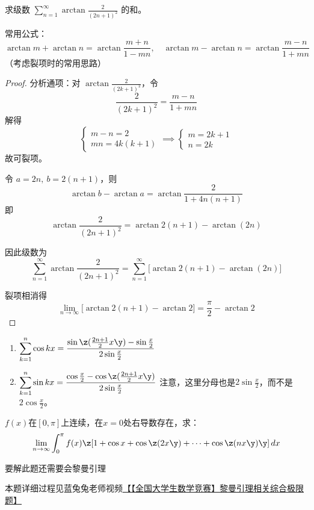 \begin{example}
求级数 \(\displaystyle \sum_{n=1}^{\infty} \arctan\frac{2}{(2n+1)^2}\) 的和。
\end{example}

\begin{remark}
常用公式：
\[
\arctan m + \arctan n = \arctan\frac{m+n}{1-mn}, \quad
\arctan m - \arctan n = \arctan\frac{m-n}{1+mn}
\]
（考虑裂项时的常用思路）
\end{remark}

\begin{proof}
分析通项：对 \(\displaystyle \arctan\frac{2}{(2k+1)^2}\)，令
\[
\frac{2}{(2k+1)^2} = \frac{m-n}{1+mn}
\]
解得
\[
\begin{cases}
m-n=2 \\
mn=4k(k+1)
\end{cases}
\implies
\begin{cases}
m=2k+1 \\
n=2k
\end{cases}
\]
故可裂项。

令 \(a=2n,\ b=2(n+1)\)，则
\[
\arctan b - \arctan a = \arctan\frac{2}{1+4n(n+1)}
\]
即
\[
\arctan\frac{2}{(2n+1)^2} = \arctan 2(n+1) - \arctan(2n)
\]

因此级数为
\[
\sum_{n=1}^{\infty} \arctan\frac{2}{(2n+1)^2}
= \sum_{n=1}^{\infty} \big[\arctan 2(n+1) - \arctan(2n)\big]
\]

裂项相消得
\[
\lim_{n\to\infty} \big[\arctan 2(n+1) - \arctan 2\big]
= \frac{\pi}{2} - \arctan 2
\]
\end{proof}

\begin{lemma}\label{三角等式}
\begin{enumerate}
\item $ \displaystyle \sum\limits_{k=1}^{n} \cos kx = 
        \frac{\sin\z(\frac{2n+1}{2} x\y)-\sin \frac{x}{2}}{2\sin \frac{x}{2}}$
\item $ \displaystyle \sum\limits_{k=1}^{n} \sin kx = 
        \frac{\cos \frac{x}{2}-\cos\z(\frac{2n+1}{2} x\y)}{2\sin \frac{x}{2}}$
        注意，这里分母也是$2\sin \frac{x}{2}$，而不是$2\cos \frac{x}{2}$。
\end{enumerate}
\end{lemma}

\begin{example}
$f(x)$在$[0,\pi]$上连续，在$x=0 $处右导数存在，求：
\[ \lim_{n\to \infty} \int_{0}^{\pi}f(x)\z[1+\cos x+ \cos\z(2x\y)+\cdots+ \cos \z(n x\y)  \y]  \,dx  \]
\end{example}
\begin{remark}
要解此题还需要会黎曼引理

本题详细过程见蓝兔兔老师视频\href{ https://www.bilibili.com/video/BV17x4y1b7e2/?share_source=copy_web&vd_source=270527b9d8a800872b201575fba2747c}{【【全国大学生数学竞赛】黎曼引理相关综合极限题】}
\end{remark}

